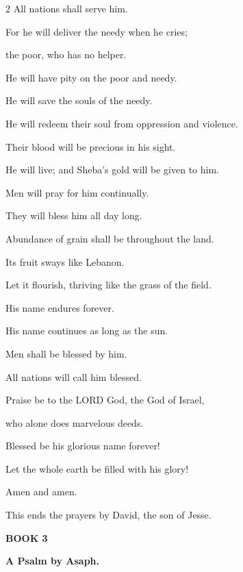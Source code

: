 \begin{multicols}{2}
	All nations shall serve him.
	
	
	\myverse{}For he will deliver the needy when he cries;
	
	the poor, who has no helper.
	
	
	\myverse{}He will have pity on the poor and needy.
	
	He will save the souls of the needy.
	
	
	\myverse{}He will redeem their soul from oppression and violence.
	
	Their blood will be precious in his sight.
	
	
	\myverse{}He will live; and Sheba’s gold will be given to him.
	
	Men will pray for him continually.
	
	They will bless him all day long.
	
	
	\myverse{}Abundance of grain shall be throughout the land.
	
	Its fruit sways like Lebanon.
	
	Let it flourish, thriving like the grass of the field.
	
	
	\myverse{}His name endures forever.
	
	His name continues as long as the sun.
	
	Men shall be blessed by him.
	
	All nations will call him blessed.
	
	\vspace{\baselineskip}
	
	\myverse{}Praise be to the LORD God, the God of Israel,
	
	who alone does marvelous deeds.
	
	
	\myverse{}Blessed be his glorious name forever!
	
	Let the whole earth be filled with his glory!
	
	Amen and amen.
	
	\vspace{\baselineskip}
	
	\myverse{}This ends the prayers by David, the son of Jesse.
	
	
		\vspace{\baselineskip}
	\begin{center}
		{\LARGE\textbf{BOOK 3}}
	\end{center}
		\vspace{-\baselineskip}
	
	\mychapter{}\textbf{A Psalm by Asaph.}
	

\end{multicols}
